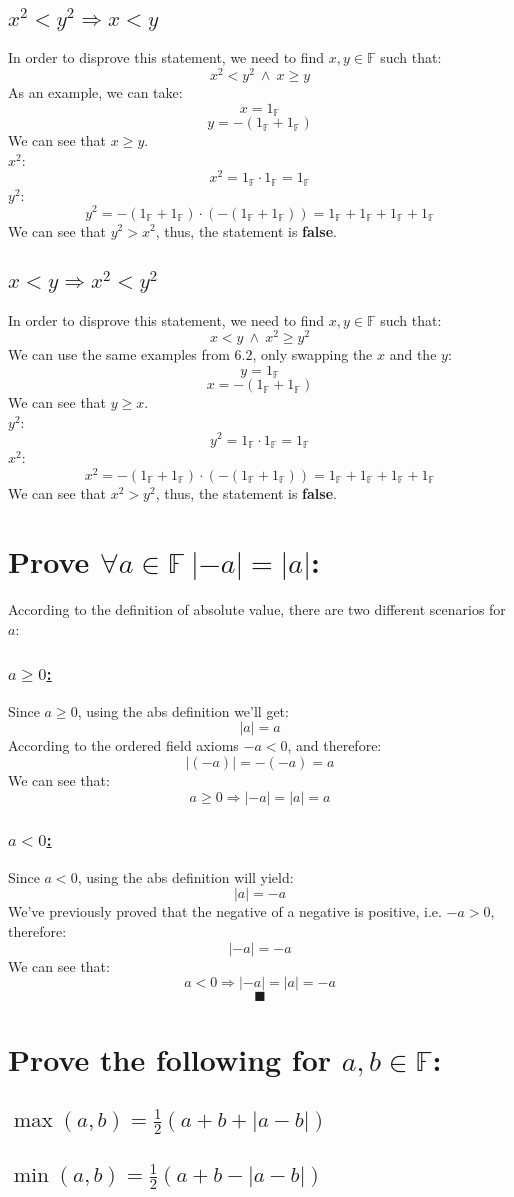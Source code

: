 \documentclass[a4paper, 12pt]{article}
\newcommand{\sub}[1]{\subsection{\underline{#1}}}
\newcommand{\subsub}[1]{\subsubsection{\underline{#1}}}
\newcommand{\?}{\stackrel{?}{=}}
\newcommand{\F}{\ensuremath{\mathbb{F}}}
\newcommand{\Onef}{\ensuremath{1_{\F}}}
\renewcommand{\qed}{$$\blacksquare$$}
\renewcommand{\b}[1]{\textbf{#1}}
\begin{document}
\sub{$ x^2<y^2 \Longrightarrow x<y $}
In order to disprove this statement, we need to find $x,y \in{\F}$ such that: $$ x^2<y^2 ~\land~ x \geq y $$
As an example, we can take: $$ x = \Onef$$ $$y=-(\Onef+\Onef) $$
We can see that $x\geq y$.\\
$x^2$: $$ x^2 = \Onef\cdot\Onef=\Onef $$
$y^2$: $$ y^2 = -(\Onef+\Onef)\cdot(-(\Onef+\Onef))=\Onef+\Onef+\Onef+\Onef $$
We can see that $y^2>x^2$, thus, the statement is \b{false}.
\pagebreak

\sub{$ x<y \Longrightarrow x^2<y^2 $}
In order to disprove this statement, we need to find $x,y \in{\F}$ such that: $$ x<y ~\land~ x^2\geq y^2 $$
We can use the same examples from $6.2$, only swapping the $x$ and the $y$: $$ y = \Onef$$ $$x=-(\Onef+\Onef) $$
We can see that $y\geq x$.\\
$y^2$: $$ y^2 = \Onef\cdot\Onef=\Onef $$
$x^2$: $$ x^2 = -(\Onef+\Onef)\cdot(-(\Onef+\Onef))=\Onef+\Onef+\Onef+\Onef $$
We can see that $x^2>y^2$, thus, the statement is \b{false}.

\section{Prove $\forall{a}\in\F~|-a|=|a|$:}
According to the definition of absolute value, there are two different scenarios for $a$:
\subsub{$a \geq 0$:}
Since $a\geq 0$, using the abs definition we'll get: $$ |a| = a $$
According to the ordered field axioms $-a < 0$, and therefore: $$|(-a)| = -(-a) = a$$
We can see that: $$a \geq 0 \Longrightarrow |-a|=|a|=a$$

\subsub{$ a<0 $:}
Since $a<0$, using the abs definition will yield: $$|a| = -a $$
We've previously proved that the negative of a negative is positive, i.e. $-a>0$, therefore:
$$ |-a| = -a $$
We can see that: $$a < 0 \Longrightarrow |-a|=|a|=-a$$
\qed\pagebreak

\section{Prove the following for $a,b\in\F$:}
\sub{$\max(a,b)=\frac{1}{2}(a+b+|a-b|)$}

\sub{$\min(a,b)=\frac{1}{2}(a+b-|a-b|)$}


\end{document}
